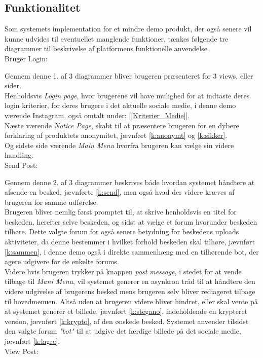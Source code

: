 \subsection{Funktionalitet}
\label{funktionalitet}
Som systemets implementation for et mindre demo produkt, der også senere vil kunne udvides til eventuellet manglende funktioner, tænkes følgende tre diagrammer til beskrivelse af platformens funktionelle anvendelse.\\
Bruger Login:


Gennem denne 1. af 3 diagrammer bliver brugeren præsenteret for 3 views, eller sider.\\ 
Henholdsvis \textit{Login page}, hvor brugerene vil have mulighed for at indtaste deres login kriterier, for deres brugere i det aktuelle sociale medie, i denne demo værende Instagram, også omtalt under: [\ref{Kriterier_Medie}].\\
Næste værende \textit{Notice Page}, skabt til at præsentere brugeren for en dybere forklaring af produktets anonymitet, jævnført \ref{k:anonymt} og \ref{k:sikker}.\\ 
Og sidste side værende \textit{Main Menu} hvorfra brugeren kan vælge sin videre handling.\\
Send Post:


Gennem denne 2. af 3 diagrammer beskrives både hvordan systemet håndtere at afsende en besked, jævnførte \ref{k:send}, men også hvad der videre kræves af brugeren for samme udførelse.\\
Brugeren bliver nemlig først promptet til, at skrive henholdsvis en titel for beskeden, herefter selve beskeden, og sidst at vælge et forum hvorunder beskeden tilhøre. Dette valgte forum for også senere betydning for beskedens uploads aktiviteter, da denne bestemmer i hvilket forhold beskeden skal tilhøre, jævnført \ref{k:sammen}, i denne demo også i direkte sammenhæng med en tilhørende bot, der agere udgivere for de enkelte forums.\\
Videre hvis brugeren trykker på knappen \textit{post message}, i stedet for at vende tilbage til \textit{Mani Menu}, vil systemet generer en asynkron tråd til at håndtere den videre udgivelse af brugerens besked mens brugeren selv bliver rediageret tilbage til hovedmenuen.
Altså uden at brugeren videre bliver hindret, eller skal vente på at systemet generer et billede, jævnført \ref{k:stegano}, indeholdende en krypteret version, jævnført \ref{k:krypto}, af den ønskede besked. Systemet anvender tilsidst den valgte forum \textit{"bot"} til at udgive det færdige billede på det sociale medie, jævnført \ref{k:lagre}.\\
View Post:

